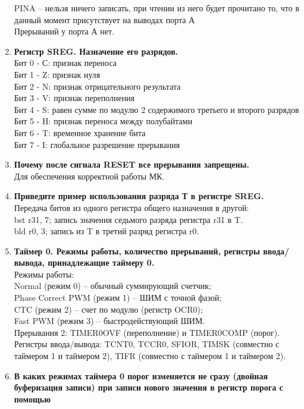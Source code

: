 \documentclass[a4paper, 12pt, twoside]{article}
\begin{document}
\begin{enumerate}
		PINA – нельзя ничего записать, при чтении из него будет прочитано то, что в данный момент присутствует на выводах порта А\\
		Прерываний у порта А нет.
	\item \textbf{Регистр SREG. Назначение его разрядов.}\\
		Бит 0 - С: признак переноса\\
		Бит 1 - Z: признак нуля\\
		Бит 2 - N: признак отрицательного результата\\
		Бит 3 - V: признак переполнения\\
		Бит 4 - S: равен сумме по модулю 2 содержимого третьего и второго разрядов\\
		Бит 5 - H: признак переноса между полубайтами\\
		Бит 6 - T: временное хранение бита\\
		Бит 7 - I: глобальное разрешение прерывания
	\item \textbf{Почему после сигнала RESET все прерывания запрещены.}\\
		Для обеспечения корректной работы МК.
	\item \textbf{Приведите пример использования разряда Т в регистре SREG.}\\
		Передача битов из одного регистра общего назначения в другой: \\
		bst r31, 7; запись значения седьмого разряда регистра r31 в T.\\
		bld r0, 3; запись из T в третий разряд регистра r0.
	\item \textbf{Таймер 0. Режимы работы, количество прерываний, регистры ввода/вывода,
принадлежащие таймеру 0.}\\
		Режимы работы:\\
		Normal (режим 0) – обычный суммирующий счетчик;\\
		Phase Correct PWM (режим 1) – ШИМ с точной фазой;\\
		CTC (режим 2) – счет по модулю (регистр OCR0);\\
		Fast PWM (режим 3) – быстродействующий ШИМ.\\
		Прерывания 2: TIMER0OVF (переполнение) и TIMER0COMP (порог).\\
		Регистры ввода/вывода: TCNT0, TCCR0, SFIOR, TIMSK (совместно с таймером 1
		и таймером 2), TIFR (совместно с таймером 1 и таймером 2).
	\item \textbf{В каких режимах таймера 0 порог изменяется не сразу (двойная буферизация записи) при записи нового значения в регистр порога с помощью
}
\end{enumerate}
\end{document}
